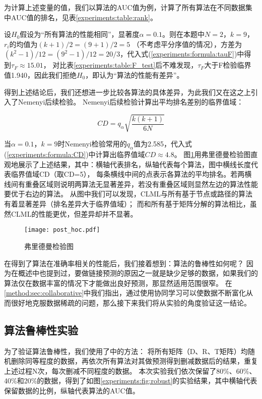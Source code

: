 为计算上述变量的值，我们以算法的AUC值为例，计算了所有算法在不同数据集中AUC值的排名，见表\ref{experiments:table:rank}。


设$H_0$假设为“所有算法的性能相同”，显著度$\alpha=0.1$。则在本题中$N=2$，$k=9$，$r_i$的均值为$(k+1)/2=(9+1)/2=5$
（不考虑平分序值的情况），方差为$(k^2-1)/12=(9^2-1)/12=20/3$，代入式(\ref{experiments:formula:tauF})中得到$\tau_F\approx{15.01}$，
对比表\ref{experiments:table:F_test}后不难发现，$\tau_F$大于F检验临界值1.940，因此我们拒绝$H_0$，即认为“算法的性能有差异”。


得到上述结论后，我们还想进一步比较各算法的具体差异，为此我们又在这之上引入了Nemenyi后续检验。
Nemenyi后续检验计算出平均排名差别的临界值域：

\begin{equation}
    CD=q_{\alpha}\sqrt{\frac{k(k+1)}{6N}}
    \label{experiments:formula:CD}
\end{equation}


当$\alpha=0.1$，$k=9$时Nemenyi检验常用的$q_{\alpha}$值为2.585，代入式(\ref{experiments:formula:CD})中计算出临界值域$CD\approx4.8$。
图\ref{experiments:fig:post_hoc}用弗里德曼检验图直观地展示了上述结果，其中：横轴代表排名，纵轴代表每个算法，图中横线长度代表临界值域CD（取CD=5），
每条横线中间的点表示各算法的平均排名。若两横线间有重叠区域则说明两算法无显著差异，若没有重叠区域则显然左边的算法性能要优于右边的算法。
从图中我们可以发现，CLML与所有基于节点或路径的算法有着显著差异（排名差异大于临界值域）；
而和所有基于矩阵分解的算法相比，虽然CLML的性能更优，但差异却并不显著。

\begin{figure}[]
    \centering
    \texttt{[image: post\_hoc.pdf]}
    \caption{弗里德曼检验图}
    \label{experiments:fig:post_hoc}
\end{figure}


在得到了算法在准确率相关的性能后，我们接着想到：算法的鲁棒性如何呢？
因为在概述中也提到过，要做链接预测的原因之一就是缺少足够的数据，如果我们的算法仅在数据丰富的情况下才能做出良好预测，那显然适用范围很窄。
在\ref{method:sec:collaborative}中我们指出，通过使用协同学习可以使数据不断富化从而很好地克服数据稀疏的问题，那么接下来我们将从实验的角度验证这一结论。


\subsection{算法鲁棒性实验}
为了验证算法鲁棒性，我们使用了\cite{cannistraci2013link}\cite{valverde2014link}\cite{hanley1982meaning}中的方法：
将所有矩阵（D、R、T矩阵）均随机删除同等程度的数据，再依次所有算法对其做预测得到删减数据后的结果，重复上述过程N次，每次删减不同程度的数据。
本次实验我们依次保留了80\%、60\%、40\%和20\%的数据，得到了如图\ref{experiments:fig:robust}的实验结果，其中横轴代表保留数据的比例，纵轴代表算法的AUC值。


